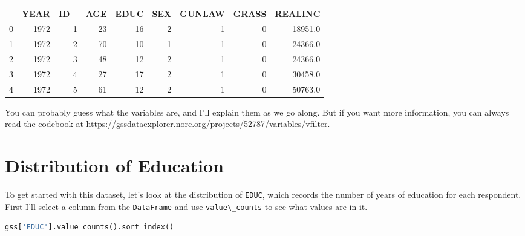 \begin{tabular}{lrrrrrrrr}
\toprule
{} &  YEAR &  ID\_ &  AGE &  EDUC &  SEX &  GUNLAW &  GRASS &  REALINC \\
\midrule
0 &  1972 &    1 &   23 &    16 &    2 &       1 &      0 &  18951.0 \\
1 &  1972 &    2 &   70 &    10 &    1 &       1 &      0 &  24366.0 \\
2 &  1972 &    3 &   48 &    12 &    2 &       1 &      0 &  24366.0 \\
3 &  1972 &    4 &   27 &    17 &    2 &       1 &      0 &  30458.0 \\
4 &  1972 &    5 &   61 &    12 &    2 &       1 &      0 &  50763.0 \\
\bottomrule
\end{tabular}

You can probably guess what the variables are, and I'll explain them as
we go along. But if you want more information, you can always read the
codebook at
\url{https://gssdataexplorer.norc.org/projects/52787/variables/vfilter}.

\hypertarget{distribution-of-education}{%
\section{Distribution of Education}\label{distribution-of-education}}

To get started with this dataset, let's look at the distribution of
\passthrough{\lstinline!EDUC!}, which records the number of years of
education for each respondent. First I'll select a column from the
\passthrough{\lstinline!DataFrame!} and use
\passthrough{\lstinline!value\_counts!} to see what values are in it.

\begin{lstlisting}[language=Python]
gss['EDUC'].value_counts().sort_index()
\end{lstlisting}

